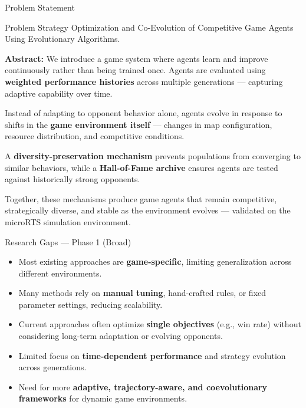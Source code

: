 \documentclass[aspectratio=169, 10pt]{beamer}
\begin{document}
\begin{frame}{Problem Statement}
\begin{block}{Problem}
Strategy Optimization and Co-Evolution of Competitive Game Agents Using Evolutionary Algorithms.
\end{block}
\vspace{0.15cm}
\small
\textbf{Abstract:} We introduce a game system where agents learn and improve continuously rather than being trained once. Agents are evaluated using \textbf{weighted performance histories} across multiple generations --- capturing adaptive capability over time.

\vspace{0.15cm}
Instead of adapting to opponent behavior alone, agents evolve in response to shifts in the \textbf{game environment itself} --- changes in map configuration, resource distribution, and competitive conditions.

\vspace{0.15cm}
A \textbf{diversity-preservation mechanism} prevents populations from converging to similar behaviors, while a \textbf{Hall-of-Fame archive} ensures agents are tested against historically strong opponents.

\vspace{0.15cm}
Together, these mechanisms produce game agents that remain competitive, strategically diverse, and stable as the environment evolves --- validated on the microRTS simulation environment.
\end{frame}

\begin{frame}{Research Gaps --- Phase 1 (Broad)}
\small
\begin{itemize}
    \item Most existing approaches are \textbf{game-specific}, limiting generalization across different environments.
    \item Many methods rely on \textbf{manual tuning}, hand-crafted rules, or fixed parameter settings, reducing scalability.
    \item Current approaches often optimize \textbf{single objectives} (e.g., win rate) without considering long-term adaptation or evolving opponents.
    \item Limited focus on \textbf{time-dependent performance} and strategy evolution across generations.
    \item Need for more \textbf{adaptive, trajectory-aware, and coevolutionary frameworks} for dynamic game environments.
\end{itemize}
\vspace{0.2cm}

\end{frame}
\end{document}
